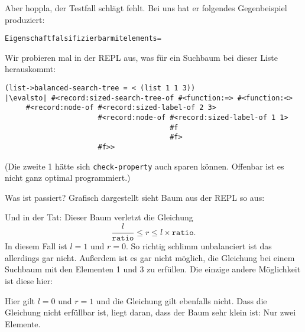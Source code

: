 Aber hoppla, der Testfall schlägt fehlt.  Bei uns hat er folgendes
Gegenbeispiel produziert:
%
\begin{alltt}
Eigenschaft falsifizierbar mit elements = 
\end{alltt}
%
Wir probieren mal in der REPL aus, was für ein Suchbaum bei dieser
Liste herauskommt:
%
\begin{lstlisting}
(list->balanced-search-tree = < (list 1 1 3))
|\evalsto| #<record:sized-search-tree-of #<function:=> #<function:<> 
     #<record:node-of #<record:sized-label-of 2 3>
                      #<record:node-of #<record:sized-label-of 1 1> 
                                       #f
                                       #f>
                      #f>>
\end{lstlisting}
%
(Die zweite 1 hätte sich \lstinline{check-property} auch sparen
können.  Offenbar ist es nicht ganz optimal programmiert.)

Was ist passiert?  Grafisch dargestellt sieht Baum aus der REPL so
aus:
%
\begin{center}
\end{center}
%
Und in der Tat: Dieser Baum verletzt die Gleichung
\[\frac{l}{\mathtt{ratio}} \leq r \leq l \times \mathtt{ratio}.\]
In diesem Fall ist $l=1$ und $r=0$.  So richtig schlimm unbalanciert
ist das allerdings gar nicht.  Außerdem ist es gar nicht möglich, die
Gleichung bei einem Suchbaum mit den Elementen 1 und 3 zu erfüllen.
Die einzige andere Möglichkeit ist diese hier:

%
\begin{center}
\end{center}
%
Hier gilt $l=0$ und $r=1$ und die Gleichung gilt ebenfalls nicht.
Dass die Gleichung nicht erfüllbar ist, liegt daran, dass der Baum
sehr klein ist: Nur zwei Elemente.

